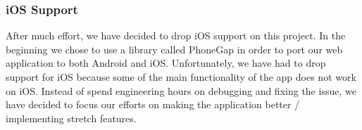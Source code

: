 \documentclass[11pt]{article}
\begin{document}
\subsubsection{iOS Support}

After much effort, we have decided to drop iOS support on this project. In the beginning we chose to use a library called PhoneGap in order to port our web application to both Android and iOS. Unfortunately, we have had to drop support for iOS because some of the main functionality of the app does not work on iOS. Instead of spend engineering hours on debugging and fixing the issue, we have decided to focus our efforts on making the application better / implementing stretch features.
\end{document}
